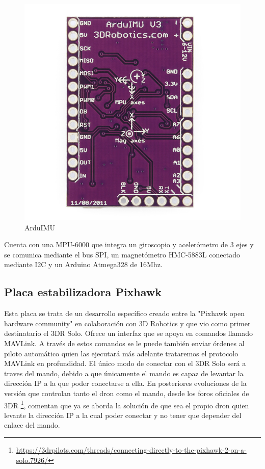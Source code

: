 \begin{figure}[H]
  \centering
  \includegraphics[scale=1]{imagenes/arduimutrasera.jpg}
  \caption{ArduIMU}
  \label{fig:arduimu}
\end{figure}

Cuenta con una MPU-6000 que integra un giroscopio y acelerómetro de 3 ejes y se comunica mediante el bus SPI, un magnetómetro HMC-5883L conectado mediante I2C y un Arduino Atmega328 de 16Mhz.

\subsection{Placa estabilizadora Pixhawk}

Esta placa se trata de un desarrollo específico creado entre la "Pixhawk open hardware community" en colaboración con 3D Robotics y que vio como primer destinatario el 3DR Solo. Ofrece un interfaz que se apoya en comandos llamado MAVLink. A través de estos comandos se le puede también enviar órdenes al piloto automático quien las ejecutará más adelante trataremos el protocolo MAVLink en profundidad. El único modo de conectar con el 3DR Solo será a traves del mando, debido a que únicamente el mando es capaz de levantar la dirección IP a la que poder conectarse a ella. En posteriores evoluciones de la versión que controlan tanto el dron como el mando, desde los foros oficiales de 3DR \footnote{\url{https://3drpilots.com/threads/connecting-directly-to-the-pixhawk-2-on-a-solo.7926/}}, comentan que ya se aborda la solución de que sea el propio dron quien levante la dirección IP a la cual poder conectar y no tener que depender del enlace del mando.

